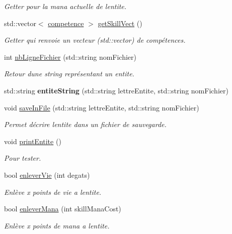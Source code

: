 \begin{DoxyCompactItemize}
\begin{DoxyCompactList}\small\item\em Getter pour la mana actuelle de l\textquotesingle{}entite. \end{DoxyCompactList}\item 
\mbox{\label{classentite_a90c927665d7c0b7d6d5202604887e1e2}} 
std\+::vector$<$ \hyperlink{classcompetence}{competence} $>$ \hyperlink{classentite_a90c927665d7c0b7d6d5202604887e1e2}{get\+Skill\+Vect} ()
\begin{DoxyCompactList}\small\item\em Getter qui renvoie un vecteur (std\+::vector) de compétences. \end{DoxyCompactList}\item 
int \hyperlink{classentite_a983d51dcdfaaddaf95096587ea33a3ec}{nb\+Ligne\+Fichier} (std\+::string nom\+Fichier)
\begin{DoxyCompactList}\small\item\em Retour d\textquotesingle{}une string représentant un entite. \end{DoxyCompactList}\item 
\mbox{\label{classentite_aef8675e5f8592e0cc56661d4d5827d1f}} 
std\+::string {\bfseries entite\+String} (std\+::string lettre\+Entite, std\+::string nom\+Fichier)
\item 
\mbox{\label{classentite_a7bd09aa63160345500b6d6c4dca6cf52}} 
void \hyperlink{classentite_a7bd09aa63160345500b6d6c4dca6cf52}{save\+In\+File} (std\+::string lettre\+Entite, std\+::string nom\+Fichier)
\begin{DoxyCompactList}\small\item\em Permet d\textquotesingle{}écrire l\textquotesingle{}entite dans un fichier de sauvegarde. \end{DoxyCompactList}\item 
\mbox{\label{classentite_abb1bd724598359ea2b7c3b05546d59d3}} 
void \hyperlink{classentite_abb1bd724598359ea2b7c3b05546d59d3}{print\+Entite} ()
\begin{DoxyCompactList}\small\item\em Pour tester. \end{DoxyCompactList}\item 
bool \hyperlink{classentite_a024cbcffabd07556d550f5941f2113d4}{enlever\+Vie} (int degats)
\begin{DoxyCompactList}\small\item\em Enlève x points de vie a l\textquotesingle{}entite. \end{DoxyCompactList}\item 
bool \hyperlink{classentite_a48c1c38c58bbfa074885ac45a2584772}{enlever\+Mana} (int skill\+Mana\+Cost)
\begin{DoxyCompactList}\small\item\em Enlève x points de mana a l\textquotesingle{}entite. \end{DoxyCompactList}\end{DoxyCompactItemize}
